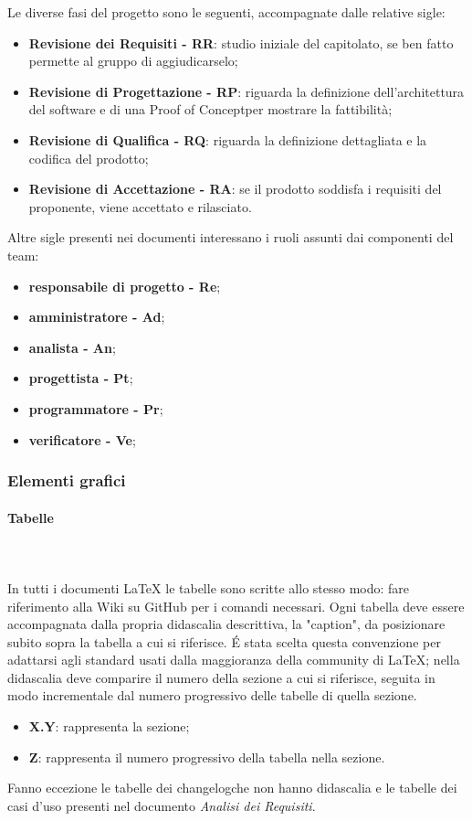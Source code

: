 		Le diverse fasi del progetto sono le seguenti, accompagnate dalle relative sigle:
		\begin{itemize}
			\item \textbf{Revisione dei Requisiti - RR}: studio iniziale del capitolato\glo, se ben fatto permette al gruppo di aggiudicarselo;
			\item \textbf{Revisione di Progettazione - RP}: riguarda la definizione dell'architettura del software e di una Proof of Concept\glosp per mostrare la fattibilità;
			\item \textbf{Revisione di Qualifica - RQ}: riguarda la definizione dettagliata e la codifica del prodotto;
			\item \textbf{Revisione di Accettazione - RA}: se il prodotto soddisfa i requisiti del proponente, viene accettato e rilasciato.		
		\end{itemize}	
		Altre sigle presenti nei documenti interessano i ruoli assunti dai componenti del team:
		\begin{itemize}
			\item \textbf{responsabile di progetto - Re};
			\item \textbf{amministratore - Ad};
			\item \textbf{analista - An};
			\item \textbf{progettista - Pt};
			\item \textbf{programmatore - Pr};
			\item \textbf{verificatore - Ve};
		\end{itemize}
		\subsubsection{Elementi grafici}
		\paragraph{Tabelle} \mbox{}\\ \mbox{}\\
		In tutti i documenti \LaTeX{} le tabelle sono scritte allo stesso modo: fare riferimento alla Wiki su GitHub per i comandi necessari.\newline 
		Ogni tabella deve essere accompagnata dalla propria didascalia descrittiva, la "caption", da posizionare subito sopra la tabella a cui si riferisce. \'E stata scelta questa convenzione per adattarsi agli standard usati dalla maggioranza della community di \LaTeX{}; nella didascalia deve comparire il numero della sezione a cui si riferisce, seguita in modo incrementale dal numero progressivo delle tabelle di quella sezione.
		\begin{itemize}
			\item \textbf{{X.Y}}: rappresenta la sezione;
			\item \textbf{{Z}}: rappresenta il numero progressivo della tabella nella sezione.
		\end{itemize}
		Fanno eccezione le tabelle dei changelog\glosp che non hanno didascalia e le tabelle dei casi d'uso presenti nel documento \textit{Analisi dei Requisiti}.
